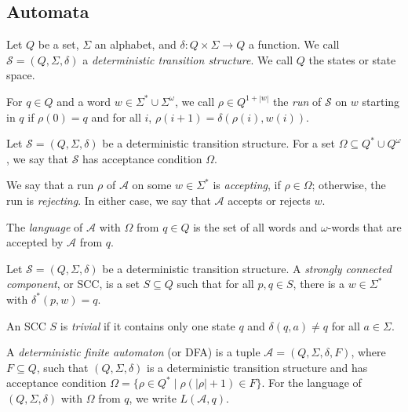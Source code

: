 \subsection{Automata}

\begin{defn}
	Let $Q$ be a set, $\Sigma$ an alphabet, and $\delta : Q \times \Sigma \rightarrow Q$ a function. We call $\mathcal{S} = (Q, \Sigma, \delta)$ a \emph{deterministic transition structure}. We call $Q$ the states or state space.
	
	For $q \in Q$ and a word $w \in \Sigma^* \cup \Sigma^\omega$, we call $\rho \in Q^{1+|w|}$ the \emph{run} of $\mathcal{S}$ on $w$ starting in $q$ if $\rho(0) = q$ and for all $i$, $\rho(i+1) = \delta(\rho(i), w(i))$.
\end{defn}

\begin{defn}
	Let $\mathcal{S} = (Q, \Sigma, \delta)$ be a deterministic transition structure. For a set $\Omega \subseteq Q^* \cup Q^\omega$, we say that $\mathcal{S}$ has acceptance condition $\Omega$.
	
	We say that a run $\rho$ of $\mathcal{A}$ on some $w \in \Sigma^*$ is \emph{accepting}, if $\rho \in \Omega$; otherwise, the run is \emph{rejecting}. In either case, we say that $\mathcal{A}$ accepts or rejects $w$. 
	
	The \emph{language} of $\mathcal{A}$ with $\Omega$ from $q \in Q$ is the set of all words and $\omega$-words that are accepted by $\mathcal{A}$ from $q$.
\end{defn}

\begin{defn}
	Let $\mathcal{S} = (Q, \Sigma, \delta)$ be a deterministic transition structure. A \emph{strongly connected component}, or SCC, is a set $S \subseteq Q$ such that for all $p, q \in S$, there is a $w \in \Sigma^*$ with $\delta^*(p, w) = q$.
	
	An SCC $S$ is \emph{trivial} if it contains only one state $q$ and $\delta(q, a) \neq q$ for all $a \in \Sigma$.
\end{defn}

\begin{defn}
	A \emph{deterministic finite automaton} (or DFA) is a tuple $\mathcal{A} = (Q, \Sigma, \delta, F)$, where $F \subseteq Q$, such that $(Q, \Sigma, \delta)$ is a deterministic transition structure and has acceptance condition $\Omega = \{ \rho \in Q^* \mid \rho(|\rho|+1) \in F \}$. For the language of $(Q, \Sigma, \delta)$ with $\Omega$ from $q$, we write $L(\mathcal{A}, q)$.
\end{defn}

